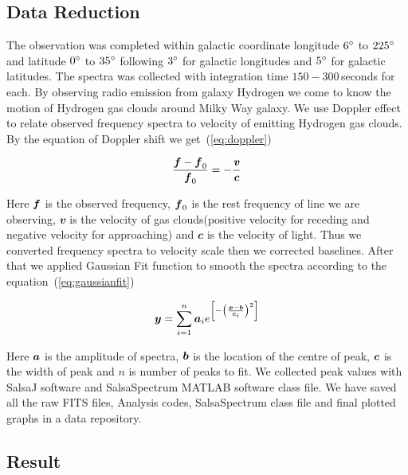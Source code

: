 \documentclass[fleqn,usenatbib]{mnras}
\begin{document}
\subsection{Data Reduction}

The observation was completed within galactic coordinate longitude $6\hbox{$^\circ$}$ to $225\hbox{$^\circ$}$ and latitude $0\hbox{$^\circ$}$ to $35\hbox{$^\circ$}$ following $3\hbox{$^\circ$}$ for galactic longitudes and $5\hbox{$^\circ$}$ for galactic latitudes. The spectra was collected with integration time $150-300$\,seconds for each. By observing radio emission from galaxy Hydrogen we come to know the motion of Hydrogen gas clouds around Milky Way galaxy. We use Doppler effect to relate observed frequency spectra to velocity of emitting Hydrogen gas clouds. By the equation of Doppler shift we get~(\ref{eq:doppler})

\begin{equation}
 \frac{\bmath{f}-\bmath{f}_{0}}{\bmath{f}_{0}}=-\frac{\mathbfit{v}}{\mathbfit{c}}
 \label{eq:doppler}
\end{equation}

Here $\bmath{f}$ is the observed frequency, $\bmath{f}_{0}$ is the rest frequency of line we are observing, $\mathbfit{v}$ is the velocity of gas clouds(positive velocity for receding and negative velocity for approaching) and $\mathbfit{c}$ is the velocity of light. Thus we converted frequency spectra to velocity scale then we corrected baselines. After that we applied Gaussian Fit function to smooth the spectra according to the equation~(\ref{eq:gaussianfit})

\begin{equation}
  \bmath{y}=\sum^n_{i=1}\bmath{a}_{i}e^{\left[-\left(\frac{\bmath{x}-\bmath{b}}{\bmath{c}_{i}} \right)^{2}\right]}
  \label{eq:gaussianfit}
\end{equation}

Here $\bmath{a}$ is the amplitude of spectra, $\bmath{b}$ is the location of the centre of peak, $\bmath{c}$ is the width of peak and $n$ is number of peaks to fit. We collected peak values with SalsaJ software and SalsaSpectrum\citep{DanielDahlin2015} MATLAB software class file. We have saved all the raw FITS files, Analysis codes, SalsaSpectrum class file and final plotted graphs in a data repository\citep{Hossain2018}.

\subsection{Result}
\end{document}
